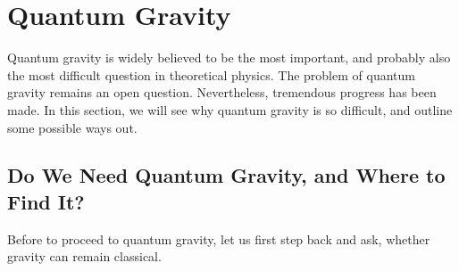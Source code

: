 \section{Quantum Gravity}

Quantum gravity is widely believed to be the most important, and probably also the most difficult question in theoretical physics. The problem of quantum gravity remains an open question. Nevertheless, tremendous progress has been made. In this section, we will see why quantum gravity is so difficult, and outline some possible ways out. 

\subsection{Do We Need Quantum Gravity, and Where to Find It?}

Before to proceed to quantum gravity, let us first step back and ask, whether gravity can remain classical. 

